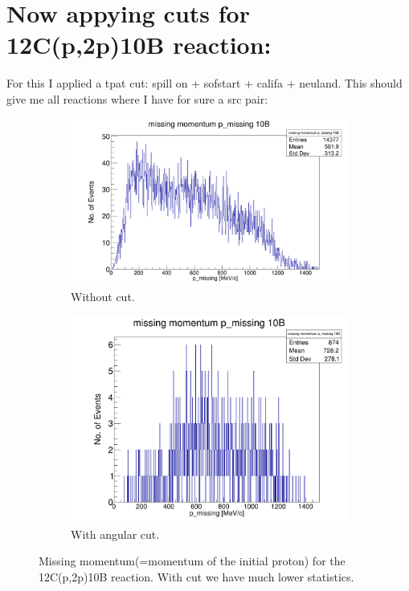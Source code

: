 \documentclass{report}
\begin{document}
\section{Now appying cuts for 12C(p,2p)10B reaction:}
For this I applied a tpat cut: spill on + sofstart + califa + neuland. This should give me all reactions where I have for sure a src pair:\newline
\begin{figure}[ht]
\begin{subfigure}{.5\textwidth}
  \centering
  \includegraphics[width=\linewidth]{missing_mom_12C_10B.png}
  \caption{Without cut.}
  \label{fig:sub-first}
\end{subfigure}
\begin{subfigure}{.5\textwidth}
  \centering
  \includegraphics[width=\linewidth]{missing_mom_12C_10B_tpat.png}
  \caption{With angular cut.}
  \label{fig:sub-second}
\end{subfigure}
	\caption{Missing momentum(=momentum of the initial proton) for the 12C(p,2p)10B reaction. With cut we have much lower statistics.}
\label{fig:missing_mom_12C_10B_tpat}
\end{figure}
\end{document}
